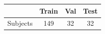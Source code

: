 \begin{tabular}{lccc}
\toprule
 & Train & Val & Test \\
\midrule
Subjects & 149 & 32 & 32 \\
\bottomrule
\end{tabular}
